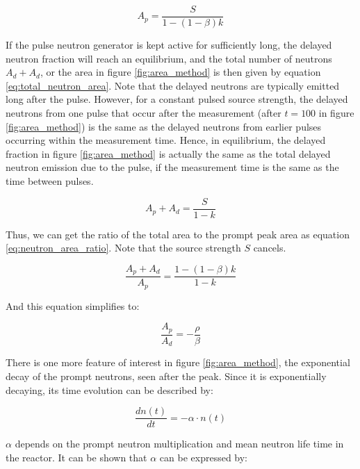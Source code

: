 \begin{equation} \label{eq:prompt_neutron_area}
A_p = \frac{S}{1-(1-\beta)k} 
\end{equation}

If the pulse neutron generator is kept active for sufficiently long, the delayed neutron fraction will reach an equilibrium, and the total number of  neutrons $A_d + A_d$, or the area in figure \ref{fig:area_method} is then given by equation \ref{eq:total_neutron_area}. Note that the delayed neutrons are typically emitted long after the pulse. However, for a constant pulsed source strength, the delayed neutrons from one pulse that occur after the measurement (after $t=100$ in figure \ref{fig:area_method}) is the same as the delayed neutrons from earlier pulses occurring within the measurement time. Hence, in equilibrium, the delayed fraction in figure \ref{fig:area_method} is actually the same as the total delayed neutron emission due to the pulse, if the measurement time is the same as the time between pulses. 

\begin{equation} \label{eq:total_neutron_area}
A_p + A_d = \frac{S}{1-k} 
\end{equation}

Thus, we can get the ratio of the total area to the prompt peak area as equation \ref{eq:neutron_area_ratio}. Note that the source strength $S$ cancels.

\begin{equation} \label{eq:neutron_area_ratio}
\frac{A_p + A_d}{A_p} = \frac{1-(1-\beta)k}{1-k} 
\end{equation}

And this equation simplifies to:

\begin{equation} \label{eq:neutron_area_ratio_simple}
\frac{A_p}{A_d} = - \frac{\rho}{\beta} 
\end{equation}

There is one more feature of interest in figure \ref{fig:area_method}, the exponential decay of the prompt neutrons, seen after the peak. Since it is exponentially decaying, its time evolution can be described by:

\begin{equation} \label{eq:area_decay}
\frac{dn(t)}{dt} = - \alpha \cdot n(t)
\end{equation} 

 $\alpha$ depends on the prompt neutron multiplication and mean neutron life time in the reactor. It can be shown that $\alpha$ can be expressed by:

